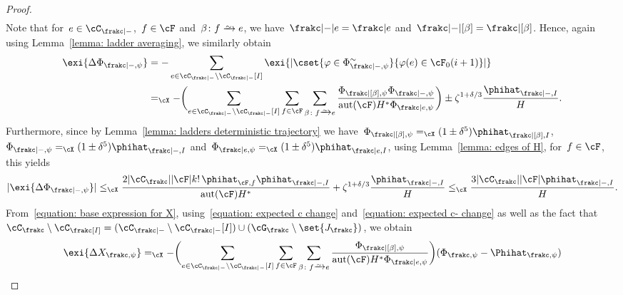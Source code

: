 \documentclass[11pt]{amsart}
\DeclarePairedDelimiter{\paren}{\lparen}{\rparen}
\DeclarePairedDelimiter{\abs}{\lvert}{\rvert}
\newcommand{\Xleq}{\leq_{\cX}}
\newcommand{\Xeq}{=_{\cX}}
\def\phi{\varphi}
\newcommand{\bijection}{\mathchoice
	{\xrightarrow{\smash{\raisebox{-3pt}{$\scriptstyle\sim$}}}}%
	{\xrightarrow{\smash{\raisebox{-3pt}{$\scriptstyle\sim$}}}}%
	{\xrightarrow{\smash{\raisebox{-2.5pt}{$\scriptscriptstyle\sim$}}}}%
	{\xrightarrow{\smash{\raisebox{-2.5pt}{$\scriptscriptstyle\sim$}}}}%
}
\DeclareMathOperator{\aut}{aut}
\newcommand{\om}{\mathord{-}}
\theoremstyle{definition}
\numberwithin{equation}{section}
\begin{document}
\begin{proof}
\begin{equation}
\begin{aligned}
			\end{aligned}
		\end{equation}
		Note that for~$e\in\cC_{\frakc|\om}$,~$f\in\cF$ and~$\beta\colon f\bijection e$, we have~$\frakc|\om|e=\frakc|e$ and~$\frakc|\mathord{-}|[\beta]=\frakc|[\beta]$.
		Hence, again using Lemma~\ref{lemma: ladder averaging}, we similarly obtain
		\begin{equation}\label{equation: expected c- change}
			\begin{aligned}
				\exi{\Delta\Phi_{\frakc|\om,\psi}}
				&=-\sum_{e\in\cC_{\frakc|\om}\setminus \cC_{\frakc|\om}[I]} \exi{\abs{\cset{ \phi\in\Phi_{\frakc|\om,\psi}^\sim }{ \phi(e)\in \cF_0(i+1) }}}\\
				&\Xeq-\paren[\bigg]{\sum_{e\in\cC_{\frakc|\om}\setminus \cC_{\frakc|\om}[I]}\sum_{f\in\cF}\sum_{\beta\colon f\bijection e}\frac{\Phi_{\frakc|[\beta],\psi}\Phi_{\frakc|\om,\psi}}{\aut(\cF)H^*\Phi_{\frakc|e,\psi}}}\pm \zeta^{1+\delta/3}\frac{\phihat_{\frakc|\om,I}}{H}.
			\end{aligned}
		\end{equation}
		Furthermore, since by Lemma~\ref{lemma: ladders deterministic trajectory} we have~$\Phi_{\frakc|[\beta],\psi}\Xeq (1\pm\delta^5)\phihat_{\frakc|[\beta],I}$,~$\Phi_{\frakc|\om,\psi}\Xeq (1\pm\delta^5)\phihat_{\frakc|\om,I}$ and~$\Phi_{\frakc|e,\psi}\Xeq (1\pm\delta^5)\phihat_{\frakc|e,I}$, using Lemma~\ref{lemma: edges of H}, for~$f\in\cF$, this yields
		\begin{equation}\label{equation: absolute expected c- change}
			\abs{\exi{\Delta\Phi_{\frakc|\om,\psi}}}
			\Xleq \frac{2\abs{\cC_\frakc}\abs{\cF}k!\,\phihat_{\cF,f}\phihat_{\frakc|\om,I}}{\aut(\cF)H^*}+\zeta^{1+\delta/3}\frac{\phihat_{\frakc|\om,I}}{H}
			\Xleq \frac{3\abs{\cC_\frakc}\abs{\cF}\phihat_{\frakc|\om,I}}{H}.
		\end{equation}
		From~\eqref{equation: base expression for X}, using~\eqref{equation: expected c change} and~\eqref{equation: expected c- change} as well as the fact that~$\cC_\frakc\setminus\cC_\frakc[I]=(\cC_{\frakc|\om}\setminus\cC_{\frakc|\om}[I])\cup (\cG_\frakc\setminus\set{J_\frakc})$, we obtain
		\begin{equation*}
			\begin{aligned}
				\exi{\Delta X_{\frakc,\psi}}
				&\Xeq -\paren[\bigg]{\sum_{e\in\cC_{\frakc|\om}\setminus \cC_{\frakc|\om}[I]}\sum_{f\in\cF}\sum_{\beta\colon f\bijection e}\frac{\Phi_{\frakc|[\beta],\psi}}{\aut(\cF)H^*\Phi_{\frakc|e,\psi}}}(\Phi_{\frakc,\psi}-\Phihat_{\frakc,\psi})\\

\end{aligned}
\end{equation*}
\end{proof}
\end{document}
